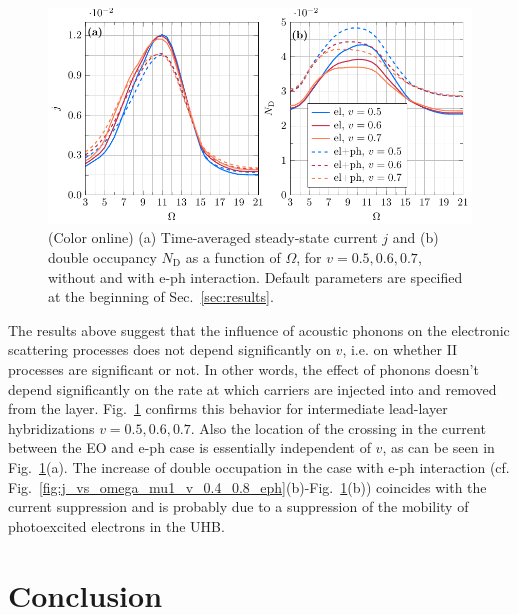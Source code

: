\documentclass[aps,prb,groupedaddress,showpacs,twocolumn,superscriptaddress,10pt]{revtex4-2}
\begin{document}
\begin{figure}[t] 
\includegraphics[width=\linewidth]{./figures_Paper1/j_vs_omega_mu1_sweep_v_E0_2_eph.pdf}
\caption{(Color online) (a) Time-averaged steady-state current $j$ and (b) double occupancy $N_{\text{D}}$ as a function of $\Omega$, for $v=0.5,0.6,0.7$, without and with e-ph interaction. Default parameters are specified at the beginning of Sec.~\ref{sec:results}.} 
\label{fig:j_vs_omega_mu1_sweep_v_E0_2_eph}
\end{figure} 
     
The results above suggest that the influence of acoustic phonons on the electronic scattering processes does not depend significantly on $v$, i.e. on whether II processes are significant or not. In other words, the effect of phonons doesn't depend significantly on the rate at which carriers are injected into and removed from the layer. Fig.~\ref{fig:j_vs_omega_mu1_sweep_v_E0_2_eph} confirms this behavior for intermediate lead-layer hybridizations $v=0.5,0.6,0.7$. Also the location of the crossing in the current  between the EO and e-ph case is essentially independent of $v$, as can be seen in 
 Fig.~\ref{fig:j_vs_omega_mu1_sweep_v_E0_2_eph}(a).
The increase of double occupation in the case with e-ph interaction 
(cf. Fig.~\ref{fig:j_vs_omega_mu1_v_0.4_0.8_eph}(b)-Fig.~\ref{fig:j_vs_omega_mu1_sweep_v_E0_2_eph}(b))
coincides with the current suppression and is probably due to a suppression of the mobility of photoexcited electrons in the UHB.

 
\section{Conclusion}   
\label{sec:conclusions} 
 
\end{document}
